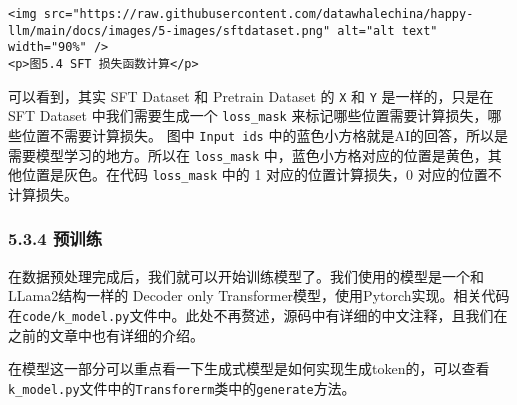 \documentclass[
]{article}
\begin{document}
\begin{verbatim}
<img src="https://raw.githubusercontent.com/datawhalechina/happy-llm/main/docs/images/5-images/sftdataset.png" alt="alt text" width="90%" />
<p>图5.4 SFT 损失函数计算</p>
\end{verbatim}

可以看到，其实 SFT Dataset 和 Pretrain Dataset 的 \texttt{X} 和
\texttt{Y} 是一样的，只是在 SFT Dataset 中我们需要生成一个
\texttt{loss\_mask} 来标记哪些位置需要计算损失，哪些位置不需要计算损失。
图中 \texttt{Input\ ids}
中的蓝色小方格就是AI的回答，所以是需要模型学习的地方。所以在
\texttt{loss\_mask}
中，蓝色小方格对应的位置是黄色，其他位置是灰色。在代码
\texttt{loss\_mask} 中的 1 对应的位置计算损失，0 对应的位置不计算损失。

\subsubsection{5.3.4 预训练}\label{ux9884ux8badux7ec3}

在数据预处理完成后，我们就可以开始训练模型了。我们使用的模型是一个和LLama2结构一样的
Decoder only
Transformer模型，使用Pytorch实现。相关代码在\texttt{code/k\_model.py}文件中。此处不再赘述，源码中有详细的中文注释，且我们在之前的文章中也有详细的介绍。

在模型这一部分可以重点看一下生成式模型是如何实现生成token的，可以查看\texttt{k\_model.py}文件中的\texttt{Transforerm}类中的\texttt{generate}方法。
\end{document}
